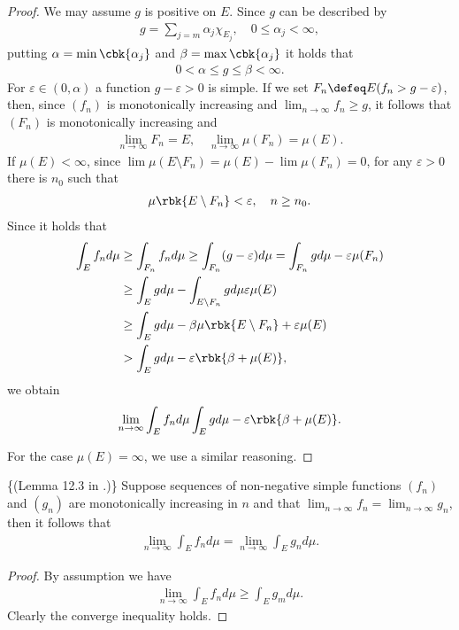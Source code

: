 \documentclass[openany, a4paper, oneside]{jsbook}
\begin{document}
\begin{proof}
We may assume $g$ is positive on $E$.
Since $g$ can be described by
\begin{align}
 g
 =
 \sum_{j=m} \alpha_j \chi_{E_j}, \quad 0 \leq \alpha_j < \infty,
\end{align}
putting $\alpha = \min \cbk{\alpha_j}$ and $\beta = \max \cbk{\alpha_j}$ it holds that
\begin{align}
 0 < \alpha \leq g \leq \beta < \infty.
\end{align}
For $\varepsilon \in (0, \alpha)$ a function $g - \varepsilon > 0$ is simple.
If we set $F_n \defeq E (f_n > g - \varepsilon)$, then, since $(f_n)$ is monotonically increasing and $\lim_{n \to \infty} f_n \geq g$, it follows that
$(F_n)$ is monotonically increasing and
\begin{align}
 \lim_{n \to \infty} F_n = E, \quad
 \lim_{n \to \infty} \mu (F_n) = \mu (E).
\end{align}
If $\mu (E) < \infty$, since $\lim \mu (E \setminus F_n) = \mu (E) - \lim \mu (F_n) = 0$, for any $\varepsilon > 0$ there is $n_0$ such that
\begin{align}
 \mu \rbk{E \setminus F_n} < \varepsilon, \quad n \geq n_0.
\end{align}
Since it holds that
\begin{align}
 \int_E f_n d \mu
 &\geq \int_{F_n} f_n d \mu
 \geq
 \int_{F_n} (g - \varepsilon) d\mu
 =
 \int_{F_n} g d \mu - \varepsilon \mu (F_n) \\
 &\geq
 \int_E g d \mu - \int_{E \setminus F_n} g d \mu \varepsilon \mu (E) \\
 &\geq
 \int_E g d \mu - \beta \mu \rbk{E \setminus F_n} + \varepsilon \mu (E) \\
 &>
 \int_E g d \mu - \varepsilon \rbk{ \beta + \mu (E)},
\end{align}
we obtain
\begin{align}
 \lim_{n \to \infty} \int_E f_n d \mu
 \int_E g d\mu - \varepsilon \rbk{\beta + \mu (E)}.
\end{align}

For the case $\mu (E) = \infty$, we use a similar reasoning.
\end{proof}

\begin{lem}\textup\{(Lemma 12.3 in \cite{SeizoIto1}.)\}
 Suppose sequences of non-negative simple functions $(f_n)$ and $(g_n)$ are monotonically increasing in $n$
 and that $\lim_{n \to \infty} f_n = \lim_{n \to \infty} g_n$, then it follows that
\begin{align}
 \lim_{n \to \infty} \int_E f_n d \mu
 =
 \lim_{n \to \infty} \int_E g_n d \mu.
\end{align}
\end{lem}
\begin{proof}
By assumption we have
\begin{align}
 \lim_{n \to \infty} \int_E f_n d\mu
 \geq
 \int_E g_m d \mu.
\end{align}
Clearly the converge inequality holds.
\end{proof}
\end{document}
